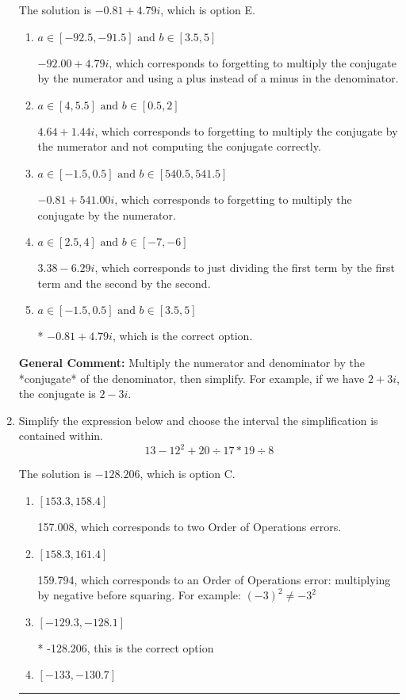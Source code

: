 \documentclass{extbook}[14pt]
\newcommand{\litem}[1]{\item #1

\rule{\textwidth}{0.4pt}}
\begin{document}
\begin{enumerate}
{The solution is \( -0.81  + 4.79 i \), which is option E.\begin{enumerate}[label=\Alph*.]
\item \( a \in [-92.5, -91.5] \text{ and } b \in [3.5, 5] \)

 $-92.00  + 4.79 i$, which corresponds to forgetting to multiply the conjugate by the numerator and using a plus instead of a minus in the denominator.
\item \( a \in [4, 5.5] \text{ and } b \in [0.5, 2] \)

 $4.64  + 1.44 i$, which corresponds to forgetting to multiply the conjugate by the numerator and not computing the conjugate correctly.
\item \( a \in [-1.5, 0.5] \text{ and } b \in [540.5, 541.5] \)

 $-0.81  + 541.00 i$, which corresponds to forgetting to multiply the conjugate by the numerator.
\item \( a \in [2.5, 4] \text{ and } b \in [-7, -6] \)

 $3.38  - 6.29 i$, which corresponds to just dividing the first term by the first term and the second by the second.
\item \( a \in [-1.5, 0.5] \text{ and } b \in [3.5, 5] \)

* $-0.81  + 4.79 i$, which is the correct option.
\end{enumerate}

\textbf{General Comment:} Multiply the numerator and denominator by the *conjugate* of the denominator, then simplify. For example, if we have $2+3i$, the conjugate is $2-3i$.
}
\litem{
Simplify the expression below and choose the interval the simplification is contained within.
\[ 13 - 12^2 + 20 \div 17 * 19 \div 8 \]

The solution is \( -128.206 \), which is option C.\begin{enumerate}[label=\Alph*.]
\item \( [153.3, 158.4] \)

 157.008, which corresponds to two Order of Operations errors.
\item \( [158.3, 161.4] \)

 159.794, which corresponds to an Order of Operations error: multiplying by negative before squaring. For example: $(-3)^2 \neq -3^2$
\item \( [-129.3, -128.1] \)

* -128.206, this is the correct option
\item \( [-133, -130.7] \)


\end{enumerate}}
\end{enumerate}
\end{document}
